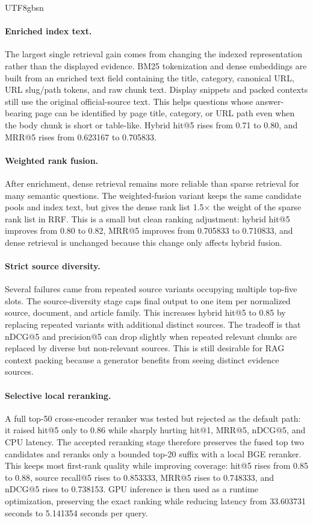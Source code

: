 \documentclass{article}
\begin{document}
\begin{CJK*}{UTF8}{gbsn}
\paragraph{Enriched index text.}
The largest single retrieval gain comes from changing the indexed representation rather than the displayed evidence. BM25 tokenization and dense embeddings are built from an enriched text field containing the title, category, canonical URL, URL slug/path tokens, and raw chunk text. Display snippets and packed contexts still use the original official-source text. This helps questions whose answer-bearing page can be identified by page title, category, or URL path even when the body chunk is short or table-like. Hybrid hit@5 rises from 0.71 to 0.80, and MRR@5 rises from 0.623167 to 0.705833.

\paragraph{Weighted rank fusion.}
After enrichment, dense retrieval remains more reliable than sparse retrieval for many semantic questions. The weighted-fusion variant keeps the same candidate pools and index text, but gives the dense rank list 1.5$\times$ the weight of the sparse rank list in RRF. This is a small but clean ranking adjustment: hybrid hit@5 improves from 0.80 to 0.82, MRR@5 improves from 0.705833 to 0.710833, and dense retrieval is unchanged because this change only affects hybrid fusion.

\paragraph{Strict source diversity.}
Several failures came from repeated source variants occupying multiple top-five slots. The source-diversity stage caps final output to one item per normalized source, document, and article family. This increases hybrid hit@5 to 0.85 by replacing repeated variants with additional distinct sources. The tradeoff is that nDCG@5 and precision@5 can drop slightly when repeated relevant chunks are replaced by diverse but non-relevant sources. This is still desirable for RAG context packing because a generator benefits from seeing distinct evidence sources.

\paragraph{Selective local reranking.}
A full top-50 cross-encoder reranker was tested but rejected as the default path: it raised hit@5 only to 0.86 while sharply hurting hit@1, MRR@5, nDCG@5, and CPU latency. The accepted reranking stage therefore preserves the fused top two candidates and reranks only a bounded top-20 suffix with a local BGE reranker. This keeps most first-rank quality while improving coverage: hit@5 rises from 0.85 to 0.88, source recall@5 rises to 0.853333, MRR@5 rises to 0.748333, and nDCG@5 rises to 0.738153. GPU inference is then used as a runtime optimization, preserving the exact ranking while reducing latency from 33.603731 seconds to 5.141354 seconds per query.


\end{CJK*}
\end{document}
